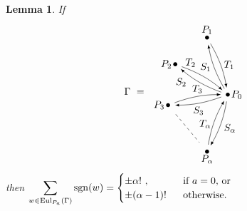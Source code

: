 \documentclass{amsproc}
\newtheorem{lemma}[theorem]{Lemma}
\theoremstyle{definition}
\theoremstyle{remark}
\numberwithin{equation}{section}
\newcommand{\sgn}{{\rm sgn}}
\newcommand{\nodeDist}{2}
\newcommand{\labelDist}{0.1}
\newcommand{\uni}{{\rm Eul}}
\begin{document}
\begin{lemma} \label{diag_Eulerian_sum_1}
If
\renewcommand{\nodeDist}{2}
\renewcommand{\labelDist}{0.1}
\[\Gamma\ =\ \begin{tikzpicture}[baseline,vertex/.style={anchor=base, circle, fill,minimum size=4pt, inner sep=0pt, outer sep=0pt},auto,
                               edge/.style={->,>=latex, shorten > = 5pt,shorten < = 5pt},
position/.style args={#1:#2 from #3}{
    at=(#3.#1), anchor=#1+180, shift=(#1:#2)
}]

  \node[vertex] (v0) {};
  \node[vertex,position = 110:{\nodeDist} from v0] (v1L) {};
  \node[vertex,position = 150:{\nodeDist} from v0] (v2L) {};
  \node[vertex,position = 190:{\nodeDist} from v0] (v3L) {};
  \node[vertex,position = 250:{\nodeDist} from v0] (v4L) {};

  \draw (v0) node[right] {$P_0$};
  \draw (v1L) node[above] {$P_{1}$};
  \draw (v2L) node[left] {$P_{2}$};
  \draw (v3L) node[left] {$P_{3}$};
  \draw (v4L) node[below] {$P_{\alpha}$};

  \draw[edge] (v0) to [bend left=10] node[left] {$S_{1}$} (v1L);
  \draw[edge] (v1L) to [bend left=10] node[right] {$T_{1}$} (v0);

  \draw[edge] (v0) to [bend left=10] node[left = 10] {$S_{2}$} (v2L);
  \draw[edge] (v2L) to [bend left=10] node[above = 14, left = 4] {$T_{2}$} (v0);

  \draw[edge] (v0) to [bend left=10] node[below] {$S_{3}$} (v3L);
  \draw[edge] (v3L) to [bend left=10] node[above] {$T_{3}$} (v0);

  \draw[dashed,shorten > = 10pt, shorten < = 10pt, bend right=10] (v3L) -- (v4L);

  \draw[edge] (v0) to [bend left=10] node[below = 4, right] {$S_{\alpha}$} (v4L);
  \draw[edge] (v4L) to [bend left=10] node[below=2, left] {$T_{\alpha}$} (v0);
\end{tikzpicture}
\]
then
$ \displaystyle \sum_{w\in \uni_{P_a}(\Gamma)}\sgn(w)=\begin{cases}
\pm \alpha!\ ,\ &\text{ if $a=0$, or}\\
\pm (\alpha-1)!\ &\text{ otherwise.}
\end{cases}
$
\end{lemma}
\end{document}

